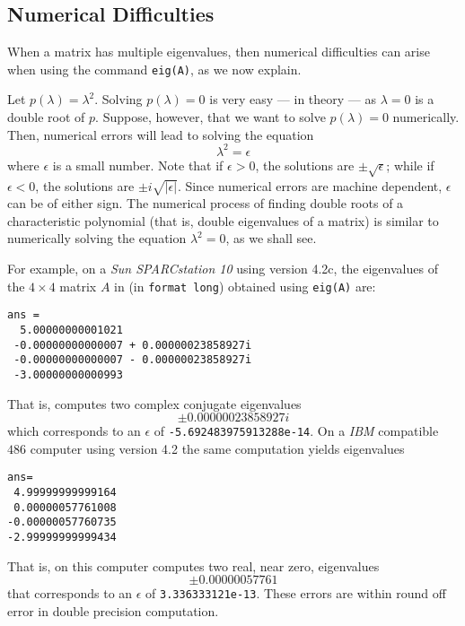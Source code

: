 \subsection*{Numerical Difficulties}

When a matrix has multiple eigenvalues, then numerical difficulties
can arise when using the \Matlab command {\tt eig(A)}, as we now explain.

Let $p(\lambda)=\lambda^2$.  Solving $p(\lambda)=0$ is very easy --- in theory
--- as $\lambda=0$ is a double root of $p$.  Suppose, however, that 
we want to solve $p(\lambda)=0$ numerically.  Then, numerical errors 
will lead to solving the equation  
\[
\lambda^2 = \epsilon
\]
where $\epsilon$ is a small number.  Note that if $\epsilon>0$, the 
solutions are $\pm\sqrt{\epsilon}$; while if $\epsilon<0$, the solutions 
are $\pm i\sqrt{|\epsilon|}$.  Since numerical errors are machine 
dependent, $\epsilon$ can be of either sign.  The numerical process of
finding double roots of a characteristic polynomial (that is, double 
eigenvalues of a matrix) is similar to numerically solving the equation 
$\lambda^2=0$, as we shall see.

For example, on a
{\em Sun SPARCstation 10\/} using \Matlab version 4.2c, the eigenvalues 
of the $4\times 4$ matrix $A$ in  (in {\tt format long}) 
obtained using {\tt eig(A)} are:
\begin{verbatim}
ans = 
  5.00000000001021                    
 -0.00000000000007 + 0.00000023858927i
 -0.00000000000007 - 0.00000023858927i
 -3.00000000000993       
\end{verbatim}
That is, \Matlab computes two complex conjugate eigenvalues
\[
\pm 0.00000023858927i
\]
which corresponds to an $\epsilon$ of {\tt -5.692483975913288e-14}.
On a {\em IBM\/} compatible $486$ computer using \Matlab version 4.2
the same computation yields eigenvalues
\begin{verbatim}
ans=
 4.99999999999164
 0.00000057761008
-0.00000057760735
-2.99999999999434
\end{verbatim}
That is, on this computer \Matlab computes two real, near zero, 
eigenvalues 
\[ 
\pm 0.00000057761
\]
that corresponds to an $\epsilon$ of {\tt 3.336333121e-13}. These
errors are within round off error in 
double precision computation.

